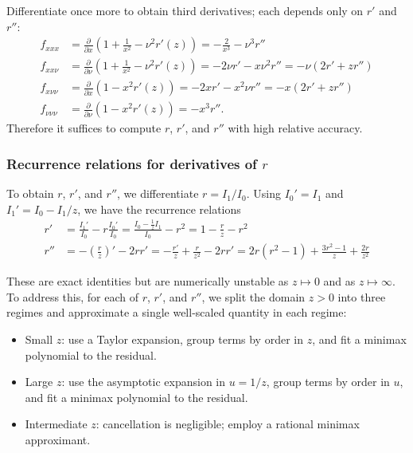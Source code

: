 \documentclass{article}
\begin{document}
Differentiate once more to obtain third derivatives;
each depends only on $r'$ and $r''$:
%
\begin{align}
  f_{xxx}       & = \frac{\partial}{\partial x}\left(1+\frac{1}{x^2}-\nu^2 r'(z)\right) = -\frac{2}{x^3} - \nu^3 r'' \label{eq:third-derivatives-unsimplified-x-x-x}                                 \\
  f_{xx\nu}     & = \frac{\partial}{\partial \nu}\left(1+\frac{1}{x^2}-\nu^2 r'(z)\right) = -2\nu r' - x\nu^2 r'' = -\nu(2r' + z r'')              \label{eq:third-derivatives-unsimplified-x-x-nu}  \\
  f_{x\nu\nu}   & = \frac{\partial}{\partial x}\left(1 - x^2 r'(z)\right) = -2x r' - x^2\nu r'' = -x(2r' + z r'')                                  \label{eq:third-derivatives-unsimplified-x-nu-nu} \\
  f_{\nu\nu\nu} & = \frac{\partial}{\partial \nu}\left(1 - x^2 r'(z)\right) = -x^3 r''. \label{eq:third-derivatives-unsimplified-nu-nu-nu}
\end{align}
%
Therefore it suffices to compute $r$, $r'$, and $r''$ with high relative accuracy.

\subsubsection{Recurrence relations for derivatives of $r$}

To obtain $r$, $r'$, and $r''$, we differentiate $r=I_1/I_0$.
Using $I_0'=I_1$ and $I_1'=I_0 - I_1/z$, we have the recurrence relations
%
\begin{align}
  r'  & = \frac{I_1'}{I_0} - r\frac{I_0'}{I_0} = \frac{I_0 - \frac{1}{z} I_1}{I_0} - r^2 = 1 - \frac{r}{z} - r^2 \label{eq:r-prime-recurrence}                                           \\
  r'' & = -\left(\frac{r}{z}\right)' - 2 r r' = -\frac{r'}{z} + \frac{r}{z^2} - 2 r r' = 2 r (r^2 - 1) + \frac{3 r^2 - 1}{z} + \frac{2 r}{z^2} \label{eq:r-second-derivative-recurrence}
\end{align}

These are exact identities but are numerically unstable as $z \mapsto 0$ and as $z \mapsto \infty$.
To address this, for each of $r$, $r'$, and $r''$, we split the domain $z>0$ into three regimes and approximate a single well-scaled quantity in each regime:
\begin{itemize}
  \item Small $z$:
        use a Taylor expansion, group terms by order in $z$, and fit a minimax polynomial to the residual.
  \item Large $z$:
        use the asymptotic expansion in $u = 1/z$, group terms by order in $u$, and fit a minimax polynomial to the residual.
  \item Intermediate $z$:
        cancellation is negligible;
        employ a rational minimax approximant.
\end{itemize}
\end{document}
